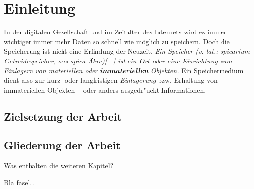 
\chapter{Einleitung}
\label{ch:Einleitung}

In der digitalen Gesellschaft und im Zeitalter des Internets wird es immer wichtiger immer mehr Daten so schnell wie möglich zu speichern. Doch die Speicherung ist nicht eine Erfindung der Neuzeit. \textit{Ein Speicher (v. lat.: spicarium Getreidespeicher, aus spica Ähre)[...] ist ein Ort oder eine Einrichtung zum Einlagern von materiellen oder} \textbf{\textit{immateriellen}} \textit{Objekten.} \cite{wiki:Speicher}
\newline
Ein Speichermedium dient also zur kurz- oder langfristigen \glqq \textit{Einlagerung}\grqq{} bzw. Erhaltung von immateriellen Objekten – oder anders ausgedr"uckt Informationen.   


\section{Zielsetzung der Arbeit}
\label{ch:Einleitung:sec:Zielsetzung}



\section{Gliederung der Arbeit}
\label{ch:Einleitung:sec:Gliederung}

Was enthalten die weiteren Kapitel?

Bla fasel\ldots

